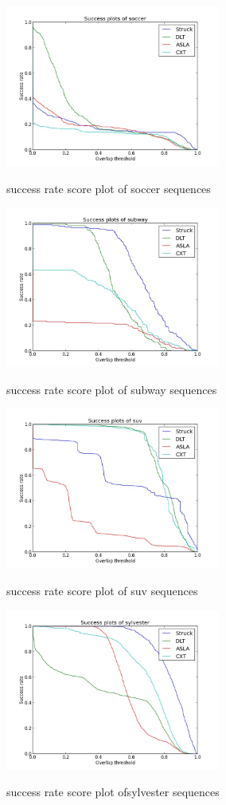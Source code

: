 \documentclass{acm_proc_article-sp}
\begin{document}
\begin{figure}[hbt]
    \includegraphics[width=200pt]{soccer.jpg}
    \label{fig:soccer}
    \caption{success rate score plot of soccer sequences}
\end{figure}

\begin{figure}[hbt]
    \includegraphics[width=200pt]{subway.jpg}
    \label{fig:subway}
    \caption{success rate score plot of subway sequences}
\end{figure}

\begin{figure}[hbt]
    \includegraphics[width=200pt]{suv.jpg}
    \label{fig:suv}
    \caption{success rate score plot of suv sequences}
\end{figure}

\begin{figure}[hbt]
    \includegraphics[width=200pt]{sylvester.jpg}
    \label{fig:sylvester}
    \caption{success rate score plot ofsylvester sequences}
\end{figure}
\end{document}
